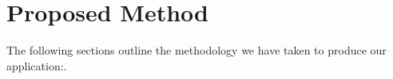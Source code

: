 \documentclass[sigconf,nonacm,11pt]{acmart}
\begin{document}




\section{Proposed Method}
The following sections outline the methodology we have taken to produce our application:.\vspace{-0.5em}
\end{document}
